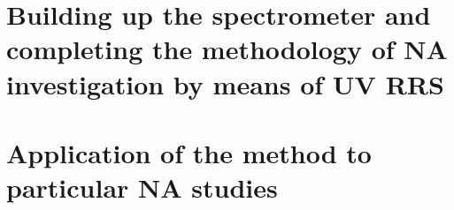 \chapter[%
	Building up the spectrometer and completing the methodology of NA
	investigation by means of UV RRS
]{%
	Building up the spectrometer and completing the methodology of NA
	investigation by means of UV RRS
}
\label{spectrometer_building}

\chapter[%
	Application of the method to particular NA studies
]{%
	Application of the method to particular NA studies
}





